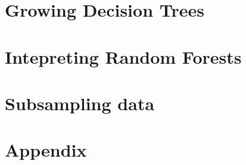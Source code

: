 \documentclass[twoside,openright,titlepage,numbers=noenddot,headinclude,%
               footinclude=true,cleardoublepage=empty,abstractoff,BCOR=5mm,%
               paper=a4,fontsize=11pt,ngerman,american]{scrreprt}
\begin{document}
\frenchspacing
\raggedbottom
{}
\pagestyle{plain}


\cleardoublepage
\cleardoublepage
\cleardoublepage
\pagestyle{scrheadings}
\cleardoublepage



\cleardoublepage
\part{Growing Decision Trees}





\cleardoublepage
\part{Intepreting Random Forests}



\cleardoublepage
\part{Subsampling data}



\appendix
\cleardoublepage
\part{Appendix}

\cleardoublepage
\end{document}
